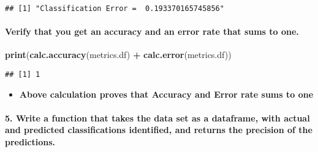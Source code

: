 \documentclass[]{article}
\newenvironment{Shaded}{\begin{snugshade}}{\end{snugshade}}
\newcommand{\ControlFlowTok}[1]{\textcolor[rgb]{0.13,0.29,0.53}{\textbf{#1}}}
\newcommand{\KeywordTok}[1]{\textcolor[rgb]{0.13,0.29,0.53}{\textbf{#1}}}
\newcommand{\NormalTok}[1]{#1}
\newcommand{\OperatorTok}[1]{\textcolor[rgb]{0.81,0.36,0.00}{\textbf{#1}}}
\newcommand{\StringTok}[1]{\textcolor[rgb]{0.31,0.60,0.02}{#1}}
\providecommand{\tightlist}{%
  \setlength{\itemsep}{0pt}\setlength{\parskip}{0pt}}
\let\oldparagraph\paragraph
\renewcommand{\paragraph}[1]{\oldparagraph{#1}\mbox{}}
\begin{document}
\begin{Shaded}
\end{Shaded}

\begin{verbatim}
## [1] "Classification Error =  0.193370165745856"
\end{verbatim}

\hypertarget{verify-that-you-get-an-accuracy-and-an-error-rate-that-sums-to-one.}{%
\paragraph{Verify that you get an accuracy and an error rate that sums
to
one.}\label{verify-that-you-get-an-accuracy-and-an-error-rate-that-sums-to-one.}}

\begin{Shaded}
\begin{Highlighting}[]
\KeywordTok{print}\NormalTok{(}\KeywordTok{calc.accuracy}\NormalTok{(metrics.df) }\OperatorTok{+}\StringTok{ }\KeywordTok{calc.error}\NormalTok{(metrics.df))}
\end{Highlighting}
\end{Shaded}

\begin{verbatim}
## [1] 1
\end{verbatim}

\begin{itemize}
\tightlist
\item
  \textbf{Above calculation proves that Accuracy and Error rate sums to
  one}
\end{itemize}

\hypertarget{write-a-function-that-takes-the-data-set-as-a-dataframe-with-actual-and-predicted-classifications-identified-and-returns-the-precision-of-the-predictions.}{%
\paragraph{5. Write a function that takes the data set as a dataframe,
with actual and predicted classifications identified, and returns the
precision of the
predictions.}\label{write-a-function-that-takes-the-data-set-as-a-dataframe-with-actual-and-predicted-classifications-identified-and-returns-the-precision-of-the-predictions.}}
\end{document}
